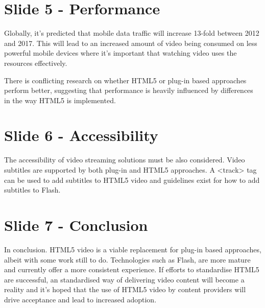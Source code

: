 \documentclass[a4paper]{article}
\begin{document}
\section*{Slide 5 - Performance}
Globally, it's predicted that mobile data traffic will increase 13-fold between 2012 and 2017. This will lead to an increased amount of video being consumed on less powerful mobile devices where it's important that watching video uses the resources effectively. 

There is conflicting research on whether HTML5 or plug-in based approaches perform better, suggesting that performance is heavily influenced by differences in the way HTML5 is implemented.

\section*{Slide 6 - Accessibility}
The accessibility of video streaming solutions must be also considered. Video subtitles are supported by both plug-in and HTML5 approaches. A <track> tag can be used to add subtitles to HTML5 video and guidelines exist for how to add subtitles to Flash.


\section*{Slide 7 - Conclusion}
In conclusion. HTML5 video is a viable replacement for plug-in based approaches, albeit with some work still to do. Technologies such as Flash, are more mature and currently offer a more consistent experience. If efforts to standardise HTML5 are successful, an standardised way of delivering video content will become a reality and it's hoped that the use of HTML5 video by content providers will drive acceptance and lead to increased adoption.
\end{document}
